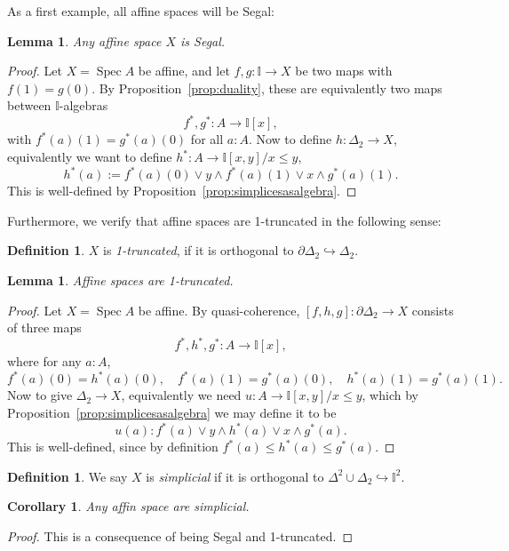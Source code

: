 \documentclass[12pt]{amsart}
\newtheorem{lemma}[theorem]{Lemma}
\newtheorem{corollary}[theorem]{Corollary}
\theoremstyle{definition}
\newtheorem{definition}[theorem]{Definition}
\newcommand{\mbb}[1]{\mathbb{#1}}
\newcommand{\I}{\mbb I}
\newcommand{\hook}{\hookrightarrow}
\newcommand{\spec}{\operatorname{Spec}}
\begin{document}
As a first example, all affine spaces will be Segal:

\begin{lemma}
  Any affine space $X$ is Segal.
\end{lemma}
\begin{proof}
  Let $X = \spec A$ be affine, and let $f,g : \I \to X$ be two maps with $f(1) = g(0)$. By Proposition~\ref{prop:duality}, these are equivalently two maps between $\I$-algebras
  \[ f^*,g^* : A \to \I[x], \]
  with $f^*(a)(1) = g^*(a)(0)$ for all $a:A$. Now to define $h : \Delta_2 \to X$, equivalently we want to define $h^* : A \to \I[x,y]/x \le y$,
  \[ h^*(a) := f^*(a)(0) \vee y \wedge f^*(a)(1) \vee x \wedge g^*(a)(1). \]
  This is well-defined by Proposition~\ref{prop:simplicesasalgebra}.
\end{proof}

Furthermore, we verify that affine spaces are 1-truncated in the following sense:

\begin{definition}
  $X$ is \emph{1-truncated}, if it is orthogonal to $\partial\Delta_2 \hook \Delta_2$.
\end{definition}

\begin{lemma}
  Affine spaces are 1-truncated.
\end{lemma}
\begin{proof}
  Let $X = \spec A$ be affine. By quasi-coherence, $[f,h,g] : \partial\Delta_2 \to X$ consists of three maps
  \[ f^*,h^*,g^* : A \to \I[x], \]
  where for any $a : A$,
  \[ f^*(a)(0) = h^*(a)(0), \quad f^*(a)(1) = g^*(a)(0), \quad h^*(a)(1) = g^*(a)(1). \]
  Now to give $\Delta_2 \to X$, equivalently we need $u : A \to \I[x,y]/x \le y$, which by Proposition~\ref{prop:simplicesasalgebra} we may define it to be
  \[ u(a) : f^*(a) \vee y \wedge h^*(a) \vee x \wedge g^*(a). \]
  This is well-defined, since by definition $f^*(a) \le h^*(a) \le g^*(a)$. 
\end{proof}

\begin{definition}
  We say $X$ is \emph{simplicial} if it is orthogonal to $\Delta^2 \cup \Delta_2 \hook \I^2$.
\end{definition}

\begin{corollary}
  Any affin space are simplicial.
\end{corollary}
\begin{proof}
  This is a consequence of being Segal and 1-truncated.
\end{proof}
\end{document}
